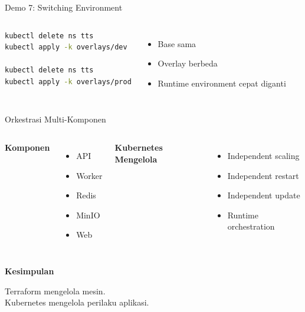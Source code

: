 \documentclass[aspectratio=169, table]{beamer}
\begin{document}
\begin{frame}[fragile]{Demo 7: Switching Environment}
\vspace{10pt}
\begin{columns}[T]

\begin{lstlisting}[language=bash]
kubectl delete ns tts
kubectl apply -k overlays/dev

kubectl delete ns tts
kubectl apply -k overlays/prod
\end{lstlisting}

\begin{itemize}
    \item Base sama
    \item Overlay berbeda
    \item Runtime environment cepat diganti
\end{itemize}

\end{columns}
\end{frame}

\begin{frame}{Orkestrasi Multi-Komponen}
\vspace{10pt}
\begin{columns}[T]

\textbf{Komponen}
\begin{itemize}
    \item API
    \item Worker
    \item Redis
    \item MinIO
    \item Web
\end{itemize}

\textbf{Kubernetes Mengelola}
\begin{itemize}
    \item Independent scaling
    \item Independent restart
    \item Independent update
    \item Runtime orchestration
\end{itemize}

\end{columns}

\vspace{8pt}
\textbf{Kesimpulan}

Terraform mengelola mesin.\\
Kubernetes mengelola perilaku aplikasi.
\end{frame}
\end{document}

